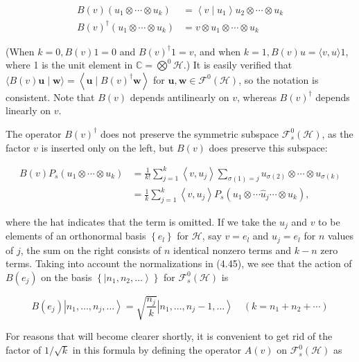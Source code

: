 \documentclass[10pt, letterpaper]{article}
\begin{document}
$$
\begin{aligned}
B(v)\left(u_{1} \otimes \cdots \otimes u_{k}\right) & =\left\langle v \mid u_{1}\right\rangle u_{2} \otimes \cdots \otimes u_{k} \\
B(v)^{\dagger}\left(u_{1} \otimes \cdots \otimes u_{k}\right) & =v \otimes u_{1} \otimes \cdots \otimes u_{k}
\end{aligned}
$$

(When $k=0, B(v) 1=0$ and $B(v)^{\dagger} 1=v$, and when $k=1, B(v) u=\langle v, u\rangle 1$, where 1 is the unit element in $\mathbb{C}=\bigotimes^{0} \mathcal{H}$.) It is easily verified that $\langle B(v) \mathbf{u} \mid \mathbf{w}\rangle=\left\langle\mathbf{u} \mid B(v)^{\dagger} \mathbf{w}\right\rangle$ for $\mathbf{u}, \mathbf{w} \in \mathcal{F}^{0}(\mathcal{H})$, so the notation is consistent. Note that $B(v)$ depends antilinearly on $v$, whereas $B(v)^{\dagger}$ depends linearly on $v$.

The operator $B(v)^{\dagger}$ does not preserve the symmetric subspace $\mathcal{F}_{s}^{0}(\mathcal{H})$, as the factor $v$ is inserted only on the left, but $B(v)$ does preserve this subspace:

$$
\begin{aligned}
B(v) P_{s}\left(u_{1} \otimes \cdots \otimes u_{k}\right) & =\frac{1}{k!} \sum_{j=1}^{k}\left\langle v, u_{j}\right\rangle \sum_{\sigma(1)=j} u_{\sigma(2)} \otimes \cdots \otimes u_{\sigma(k)} \\
& =\frac{1}{k} \sum_{j=1}^{k}\left\langle v, u_{j}\right\rangle P_{s}\left(u_{1} \otimes \cdots \widehat{u}_{j} \cdots \otimes u_{k}\right),
\end{aligned}
$$

where the hat indicates that the term is omitted. If we take the $u_{j}$ and $v$ to be elements of an orthonormal basis $\left\{e_{l}\right\}$ for $\mathcal{H}$, say $v=e_{l}$ and $u_{j}=e_{l}$ for $n$ values of $j$, the sum on the right consists of $n$ identical nonzero terms and $k-n$ zero terms. Taking into account the normalizations in (4.45), we see that the action of $B\left(e_{j}\right)$ on the basis $\left\{\left|n_{1}, n_{2}, \ldots\right\rangle\right\}$ for $\mathcal{F}_{s}^{0}(\mathcal{H})$ is

$$
B\left(e_{j}\right)\left|n_{1}, \ldots, n_{j}, \ldots\right\rangle=\sqrt{\frac{n_{j}}{k}}\left|n_{1}, \ldots, n_{j}-1, \ldots\right\rangle \quad\left(k=n_{1}+n_{2}+\cdots\right)
$$

For reasons that will become clearer shortly, it is convenient to get rid of the factor of $1 / \sqrt{k}$ in this formula by defining the operator $A(v)$ on $\mathcal{F}_{s}^{0}(\mathcal{H})$ as
\end{document}
